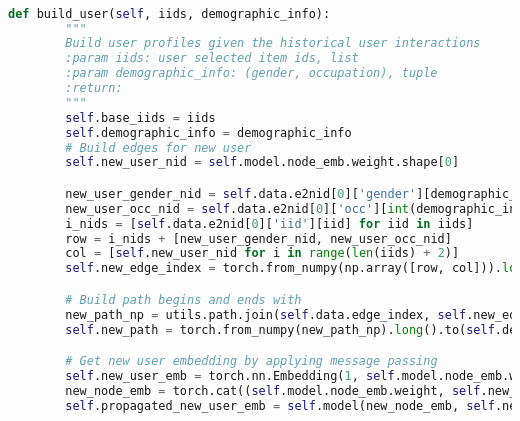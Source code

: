 \begin{lstlisting}[language=Python, caption=build\_user]

def build_user(self, iids, demographic_info):
        """
        Build user profiles given the historical user interactions
        :param iids: user selected item ids, list
        :param demographic_info: (gender, occupation), tuple
        :return:
        """
        self.base_iids = iids
        self.demographic_info = demographic_info
        # Build edges for new user
        self.new_user_nid = self.model.node_emb.weight.shape[0]

        new_user_gender_nid = self.data.e2nid[0]['gender'][demographic_info[0]]
        new_user_occ_nid = self.data.e2nid[0]['occ'][int(demographic_info[1])]
        i_nids = [self.data.e2nid[0]['iid'][iid] for iid in iids]
        row = i_nids + [new_user_gender_nid, new_user_occ_nid]
        col = [self.new_user_nid for i in range(len(iids) + 2)]
        self.new_edge_index = torch.from_numpy(np.array([row, col])).long().to(self.device_args['device'])

        # Build path begins and ends with
        new_path_np = utils.path.join(self.data.edge_index, self.new_edge_index)
        self.new_path = torch.from_numpy(new_path_np).long().to(self.device_args['device'])

        # Get new user embedding by applying message passing
        self.new_user_emb = torch.nn.Embedding(1, self.model.node_emb.weight.shape[1], max_norm=1, norm_type=2.0)
        new_node_emb = torch.cat((self.model.node_emb.weight, self.new_user_emb.weight), dim=0)
        self.propagated_new_user_emb = self.model(new_node_emb, self.new_path)[0][-1, :]

\end{lstlisting}

